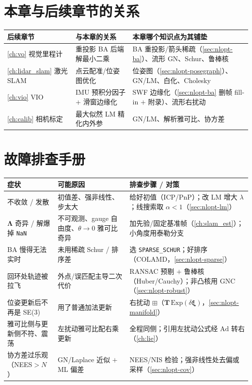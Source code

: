 \section*{本章与后续章节的关系}
\begin{table}[H]\centering\small
\begin{tabular}{lll}
\toprule
后续章节 & 与本章的关系 & 本章哪个知识点为其铺垫 \\
\midrule
\cref{ch:vo} 视觉里程计 & 重投影 BA 后端解最小二乘 & BA 重投影/箭头稀疏（\cref{sec:nlopt-ba}）、流形 GN、Schur、鲁棒核 \\
\cref{ch:lidar_slam} 激光 SLAM & 点云配准/位姿图优化 & 位姿图（\cref{sec:nlopt-posegraph}）、GN/LM、白化、Cholesky \\
\cref{ch:vio} VIO & IMU 预积分因子 $+$ 滑窗边缘化 & SWF 边缘化（\cref{sec:nlopt-ba} 删帧 fill-in $+$ 附录）、流形右扰动 \\
\cref{ch:calib} 相机标定 & 最大似然 LM 精化内外参 & GN/LM、解析雅可比、协方差 \\
\bottomrule
\end{tabular}
\end{table}

\section*{故障排查手册}
\begin{table}[H]\centering\small
\begin{tabular}{p{} p{} p{}}
\toprule
症状 & 可能原因 & 排查步骤 / 对策 \\
\midrule
不收敛 / 发散 & 初值差、强非线性、步太大 & 给好初值（ICP/PnP）；改 LM 增大 $\lambda$；线搜索取 $\alpha<1$（\cref{sec:nlopt-lm}）\\
$\boldsymbol{\Lambda}$ 奇异 / 解爆掉 \texttt{NaN} & 不可观测、gauge 自由度、$\theta\to0$ 雅可比奇异 & 加先验/固定基准帧（\cref{ch:slam_est}）；小角度用泰勒分支 \\
BA 慢得无法实时 & 未用稀疏 Schur / 排序差 & 选 \texttt{SPARSE\_SCHUR}；好排序（COLAMD，\cref{sec:nlopt-sparse}）\\
回环处轨迹被拉飞 & 外点/误匹配主导二次代价 & RANSAC 预剔 $+$ 鲁棒核（Huber/Cauchy）；非凸核用 GNC（\cref{sec:nlopt-robust}）\\
位姿更新后不再是 SE(3) & 用了普通加法更新 & 右扰动 $\boxplus$（$\mathbf{T}\,\mathrm{Exp}(\delta\boldsymbol{\xi})$，\cref{sec:nlopt-manifold}）\\
雅可比侧与更新侧不符、震荡 & 左扰动雅可比配右乘更新 & 全程同侧；引用左扰动公式经 $\mathrm{Ad}$ 转右（\cref{ch:lie}）\\
协方差过乐观（NEES$>N$）& GN/Laplace 近似 $+$ ML 偏差 & NEES/NIS 检验；强非线性处去偏或采样（\cref{sec:nlopt-cov}）\\
\bottomrule
\end{tabular}
\end{table}

